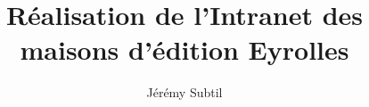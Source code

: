 \documentclass[a4paper,oneside,12pt]{report}
\title{Réalisation de l'Intranet des maisons d'édition Eyrolles}
\author{Jérémy Subtil}
\begin{document}

\newpage

\tableofcontents
\listoffigures
\listoftables
\lstlistoflistings
\newpage


\newpage




\newpage

%
%


\end{document}
